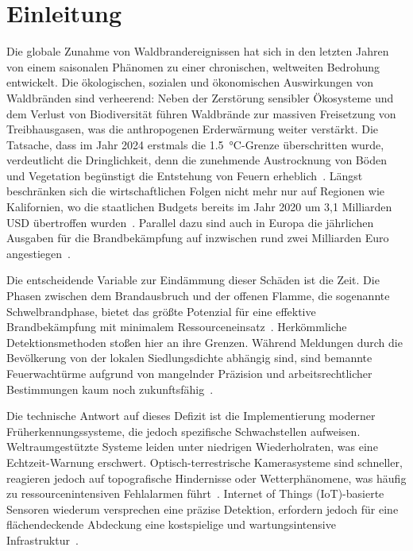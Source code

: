 \chapter{Einleitung}\label{ch:einleitung}             %

Die globale Zunahme von Waldbrandereignissen hat sich in den letzten Jahren von einem saisonalen Phänomen zu einer chronischen, weltweiten Bedrohung entwickelt. Die ökologischen, sozialen und ökonomischen Auswirkungen von Waldbränden sind verheerend: Neben der Zerstörung sensibler Ökosysteme und dem Verlust von Biodiversität führen Waldbrände zur massiven Freisetzung von Treibhausgasen, was die anthropogenen Erderwärmung weiter verstärkt.
Die Tatsache, dass im Jahr 2024 erstmals die \qty{1,5}{\degree}C-Grenze überschritten wurde, verdeutlicht die Dringlichkeit, denn die zunehmende Austrocknung von Böden und Vegetation begünstigt die Entstehung von Feuern erheblich~\cite{Copernicus2025,Umweltbundesamt2024}.
Längst beschränken sich die wirtschaftlichen Folgen nicht mehr nur auf Regionen wie Kalifornien, wo die staatlichen Budgets bereits im Jahr 2020 um 3,1 Milliarden USD übertroffen wurden~\cite{LegislativeAnalystsOffice2020}. Parallel dazu sind auch in Europa die jährlichen Ausgaben für die Brandbekämpfung auf inzwischen rund zwei Milliarden Euro angestiegen~\cite{JointResearchCentre2023}.

Die entscheidende Variable zur Eindämmung dieser Schäden ist die Zeit. Die Phasen zwischen dem Brandausbruch und der offenen Flamme, die sogenannte Schwelbrandphase, bietet das größte Potenzial für eine effektive Brandbekämpfung mit minimalem Ressourceneinsatz~\cite{TobisJakobs}. Herkömmliche Detektionsmethoden stoßen hier an ihre Grenzen. Während Meldungen durch die Bevölkerung von der lokalen Siedlungsdichte abhängig sind, sind bemannte Feuerwachtürme aufgrund von mangelnder Präzision und arbeitsrechtlicher Bestimmungen kaum noch zukunftsfähig~\cite{DirkSchneider2017}.

Die technische Antwort auf dieses Defizit ist die Implementierung moderner Früherkennungssysteme, die jedoch spezifische Schwachstellen aufweisen. Weltraumgestützte Systeme leiden unter niedrigen Wiederholraten, was eine Echtzeit-Warnung erschwert. Optisch-terrestrische Kamerasysteme sind schneller, reagieren jedoch auf topografische Hindernisse oder Wetterphänomene, was häufig zu ressourcenintensiven Fehlalarmen führt~\cite{Chagger2018}. Internet of Things (\acs{IoT})-basierte Sensoren wiederum versprechen eine präzise Detektion, erfordern jedoch für eine flächendeckende Abdeckung eine kostspielige und wartungsintensive Infrastruktur~\cite{Klick2021}.

